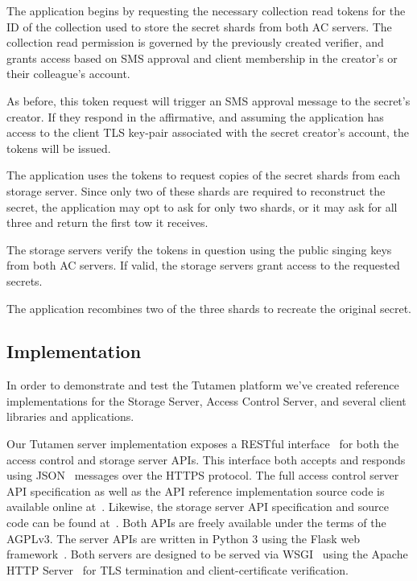 \begin{packed_enum}
\item The application begins by requesting the necessary collection
  read tokens for the ID of the collection used to store the secret
  shards from both AC servers. The collection read permission is
  governed by the previously created verifier, and grants access based
  on SMS approval and client membership in the creator's or their
  colleague's account.
\item As before, this token request will trigger an SMS approval
  message to the secret's creator. If they respond in the affirmative,
  and assuming the application has access to the client TLS key-pair
  associated with the secret creator's account, the tokens will be
  issued.
\item The application uses the tokens to request copies of the secret
  shards from each storage server. Since only two of these shards are
  required to reconstruct the secret, the application may opt to ask
  for only two shards, or it may ask for all three and return the
  first tow it receives.
\item The storage servers verify the tokens in question using the
  public singing keys from both AC servers. If valid, the storage
  servers grant access to the requested secrets.
\item The application recombines two of the three shards to recreate
  the original secret.
\end{packed_enum}

\subsection{Implementation}

In order to demonstrate and test the Tutamen platform we've created
reference implementations for the Storage Server, Access Control
Server, and several client libraries and applications.

Our Tutamen server implementation exposes a RESTful
interface~\cite{fielding2000} for both the access control and storage
server APIs. This interface both accepts and responds using
JSON~\cite{json} messages over the HTTPS protocol. The full access
control server API specification as well as the API reference
implementation source code is available online
at~\cite{src-tutamen-apiaccesscontrol}. Likewise, the storage server
API specification and source code can be found
at~\cite{src-tutamen-apistorage}. Both APIs are freely available under
the terms of the AGPLv3. The server APIs are written in Python 3 using
the Flask web framework~\cite{python-flask}. Both servers are designed
to be served via WSGI~\cite{pep3333} using the Apache HTTP
Server~\cite{apache} for TLS termination and client-certificate
verification.

